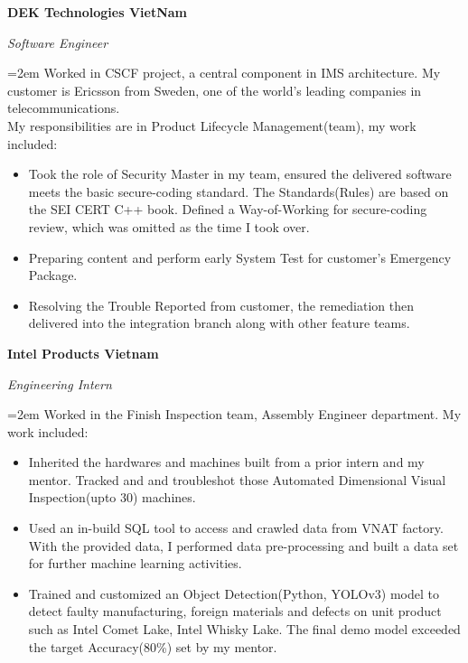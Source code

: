 \documentclass[10pt]{article}
\newcommand{\work}[4]{
  \noindent  \textbf{#1}
  \hfill 
\framebox{%
  \parbox{9em}{%
  \centering\textbf{#2}}} \par
  \noindent \textit{#3} \par
  \vspace*{0.5em}
  \noindent\hangindent=2em\hangafter=0 \small #4 
\normalsize \par}
\begin{document}
\work{DEK Technologies VietNam}
{Nov 2021--May 2023}
{Software Engineer}
{Worked in CSCF project, a central component in IMS architecture.
 My customer is Ericsson from Sweden, one of the world's leading companies in telecommunications.
 \\ My responsibilities are in Product Lifecycle Management(team), my work included:

\begin{itemize}
    \item Took the role of Security Master in my team, ensured the delivered software meets the basic secure-coding standard.
     The Standards(Rules) are based on the SEI CERT C++ book. 
     Defined a Way-of-Working for secure-coding review, which was omitted as the time I took over. 
    \item Preparing content and perform early System Test for customer's Emergency Package.
    \item Resolving the Trouble Reported from customer, the remediation then delivered into the integration branch along with other feature teams.
\end{itemize}}


\work{Intel Products Vietnam}
{Aug 2020--Feb 2021}
{Engineering Intern}
{Worked in the Finish Inspection team, Assembly Engineer department. My work included:
\begin{itemize}
    \item Inherited the hardwares and machines built from a prior intern and my mentor. 
    Tracked and and troubleshot those Automated Dimensional Visual Inspection(upto 30) machines.
    \item Used an in-build SQL tool to access and crawled data from VNAT factory. 
    With the provided data, I performed data pre-processing and built a data set for further machine learning activities. 
    \item Trained and customized an Object Detection(Python, YOLOv3) model to detect faulty manufacturing, foreign materials and defects on unit product such as Intel Comet Lake, Intel Whisky Lake.
    The final demo model exceeded the target Accuracy(80\%) set by my mentor.
\end{itemize}}

\end{document}
